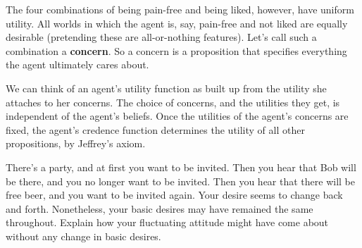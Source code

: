 The four combinations of being pain-free and being liked, however,
have uniform utility. All worlds in which the agent is, say, pain-free
and not liked are equally desirable (pretending these are
all-or-nothing features). Let's call such a combination a
\textbf{concern}. So a concern is a proposition that specifies
everything the agent ultimately cares about.

We can think of an agent's utility function as built up from the
utility she attaches to her concerns. The choice of concerns, and the
utilities they get, is independent of the agent's beliefs. Once the
utilities of the agent's concerns are fixed, the agent's credence
function determines the utility of all other propositions, by
Jeffrey's axiom.

\begin{exercise1}
  There's a party, and at first you want to be invited. Then you hear that Bob
  will be there, and you no longer want to be invited. Then you hear that
  there will be free beer, and you want to be invited again. Your desire seems
  to change back and forth. Nonetheless, your basic desires may have
  remained the same throughout. Explain how your fluctuating attitude
  might have come about without any change in basic desires.
\end{exercise1}



